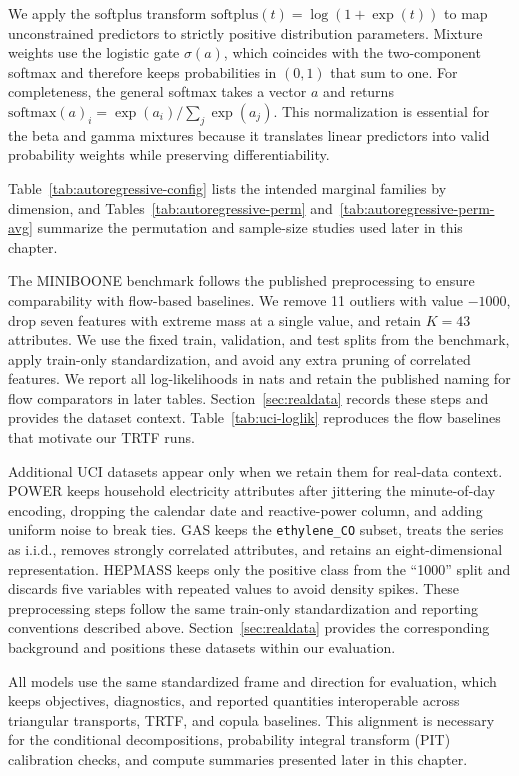 \documentclass[11pt,a4paper,twoside]{book}\usepackage[]{graphicx}\usepackage[]{xcolor}
\begin{document}
We apply the softplus transform $\mathrm{softplus}(t) = \log(1 + \exp(t))$ to map unconstrained predictors to strictly positive distribution parameters. Mixture weights use the logistic gate $\sigma(a)$, which coincides with the two-component softmax and therefore keeps probabilities in $(0,1)$ that sum to one. For completeness, the general softmax takes a vector $a$ and returns $\mathrm{softmax}(a)_i = \exp(a_i) / \sum_j \exp(a_j)$. This normalization is essential for the beta and gamma mixtures because it translates linear predictors into valid probability weights while preserving differentiability.

Table~\ref{tab:autoregressive-config} lists the intended marginal families by dimension, and Tables~\ref{tab:autoregressive-perm} and~\ref{tab:autoregressive-perm-avg} summarize the permutation and sample-size studies used later in this chapter.

The MINIBOONE benchmark follows the published preprocessing to ensure comparability with flow-based baselines. We remove 11 outliers with value $-1000$, drop seven features with extreme mass at a single value, and retain $K = 43$ attributes. We use the fixed train, validation, and test splits from the benchmark, apply train-only standardization, and avoid any extra pruning of correlated features. We report all log-likelihoods in nats and retain the published naming for flow comparators in later tables. Section~\ref{sec:realdata} records these steps and provides the dataset context. Table~\ref{tab:uci-loglik} reproduces the flow baselines that motivate our TRTF runs.

Additional UCI datasets appear only when we retain them for real-data context. POWER keeps household electricity attributes after jittering the minute-of-day encoding, dropping the calendar date and reactive-power column, and adding uniform noise to break ties. GAS keeps the \texttt{ethylene\_CO} subset, treats the series as i.i.d., removes strongly correlated attributes, and retains an eight-dimensional representation. HEPMASS keeps only the positive class from the ``1000'' split and discards five variables with repeated values to avoid density spikes. These preprocessing steps follow the same train-only standardization and reporting conventions described above. Section~\ref{sec:realdata} provides the corresponding background and positions these datasets within our evaluation.

All models use the same standardized frame and direction for evaluation, which keeps objectives, diagnostics, and reported quantities interoperable across triangular transports, TRTF, and copula baselines. This alignment is necessary for the conditional decompositions, probability integral transform (PIT) calibration checks, and compute summaries presented later in this chapter.
\end{document}
